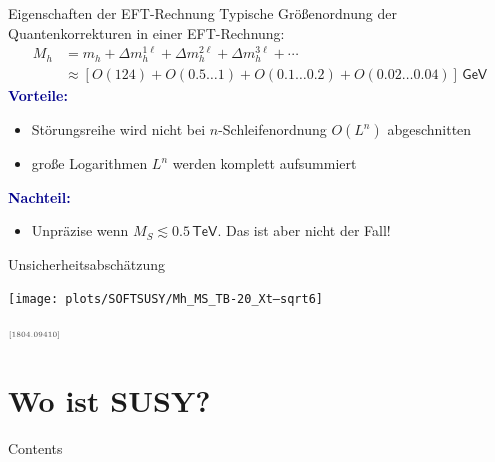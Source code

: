 \documentclass[hyperref={pdfpagelabels=false},ngerman]{beamer}
\newcommand{\eh}[1]{\,\mathsf{#1}}
\newcommand{\MS}{\ensuremath{M_S}}
\newcommand{\mycite}[1]{\ensuremath{\text{\textcolor{darkgray}{\tiny [#1]}}}}
\renewcommand{\emph}[1]{\textbf{\textcolor{darkblue}{#1}}}
\newcommand{\TeV}{\eh{TeV}}
\begin{document}
\begin{frame}{Eigenschaften der EFT-Rechnung}
  Typische Größenordnung der Quantenkorrekturen in einer EFT-Rechnung:
  \begin{align*}
    M_h &= m_h + \Delta m_h^{1\ell} + \Delta m_h^{2\ell} + \Delta m_h^{3\ell} + \cdots \\
    &\approx [O(124) + O(0.5\ldots 1) + O(0.1\ldots 0.2) + O(0.02\ldots 0.04)] \eh{GeV}
  \end{align*}
  \emph{Vorteile:}
  \begin{itemize}
  \item Störungsreihe wird nicht bei $n$-Schleifenordnung $O(L^n)$
    abgeschnitten
  \item große Logarithmen $L^n$ werden komplett aufsummiert
  \end{itemize}
  \vspace*{1em}
  \emph{Nachteil:}
  \begin{itemize}
  \item Unpräzise wenn  $\MS \lesssim 0.5\TeV$.
    Das ist aber nicht der Fall!
  \end{itemize}
\end{frame}

\begin{frame}{Unsicherheitsabschätzung}
  \begin{center}
    \texttt{[image: plots/SOFTSUSY/Mh\_MS\_TB-20\_Xt--sqrt6]}
  \end{center}
  \raggedleft\mycite{1804.09410}
\end{frame}


\section{Wo ist SUSY?}

\begin{frame}{Contents}
  \tableofcontents[currentsection]  
\end{frame}

\end{document}
